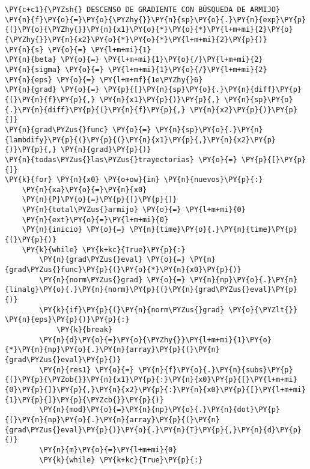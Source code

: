 \begin{itemize}
   \begin{tcolorbox}[breakable, size=fbox, boxrule=1pt, pad at break*=1mm,colback=cellbackground, colframe=cellborder]
\begin{Verbatim}[commandchars=\\\{\}]
\PY{c+c1}{\PYZsh{} DESCENSO DE GRADIENTE CON BÚSQUEDA DE ARMIJO}
\PY{n}{f}\PY{o}{=}\PY{o}{\PYZhy{}}\PY{n}{sp}\PY{o}{.}\PY{n}{exp}\PY{p}{(}\PY{o}{\PYZhy{}}\PY{n}{x1}\PY{o}{*}\PY{o}{*}\PY{l+m+mi}{2}\PY{o}{\PYZhy{}}\PY{n}{x2}\PY{o}{*}\PY{o}{*}\PY{l+m+mi}{2}\PY{p}{)}
\PY{n}{s} \PY{o}{=} \PY{l+m+mi}{1}
\PY{n}{beta} \PY{o}{=} \PY{l+m+mi}{1}\PY{o}{/}\PY{l+m+mi}{2}
\PY{n}{sigma} \PY{o}{=} \PY{l+m+mi}{1}\PY{o}{/}\PY{l+m+mi}{2}
\PY{n}{eps} \PY{o}{=} \PY{l+m+mf}{1e\PYZhy{}6}
\PY{n}{grad} \PY{o}{=} \PY{p}{[}\PY{n}{sp}\PY{o}{.}\PY{n}{diff}\PY{p}{(}\PY{n}{f}\PY{p}{,} \PY{n}{x1}\PY{p}{)}\PY{p}{,} \PY{n}{sp}\PY{o}{.}\PY{n}{diff}\PY{p}{(}\PY{n}{f}\PY{p}{,} \PY{n}{x2}\PY{p}{)}\PY{p}{]}
\PY{n}{grad\PYZus{}func} \PY{o}{=} \PY{n}{sp}\PY{o}{.}\PY{n}{lambdify}\PY{p}{(}\PY{p}{(}\PY{n}{x1}\PY{p}{,}\PY{n}{x2}\PY{p}{)}\PY{p}{,} \PY{n}{grad}\PY{p}{)}
\PY{n}{todas\PYZus{}las\PYZus{}trayectorias} \PY{o}{=} \PY{p}{[}\PY{p}{]}
\PY{k}{for} \PY{n}{x0} \PY{o+ow}{in} \PY{n}{nuevos}\PY{p}{:}
    \PY{n}{xa}\PY{o}{=}\PY{n}{x0}
    \PY{n}{P}\PY{o}{=}\PY{p}{[}\PY{p}{]}
    \PY{n}{total\PYZus{}armijo} \PY{o}{=} \PY{l+m+mi}{0}
    \PY{n}{ext}\PY{o}{=}\PY{l+m+mi}{0}
    \PY{n}{inicio} \PY{o}{=} \PY{n}{time}\PY{o}{.}\PY{n}{time}\PY{p}{(}\PY{p}{)}
    \PY{k}{while} \PY{k+kc}{True}\PY{p}{:}
        \PY{n}{grad\PYZus{}eval} \PY{o}{=} \PY{n}{grad\PYZus{}func}\PY{p}{(}\PY{o}{*}\PY{n}{x0}\PY{p}{)}   
        \PY{n}{norm\PYZus{}grad} \PY{o}{=} \PY{n}{np}\PY{o}{.}\PY{n}{linalg}\PY{o}{.}\PY{n}{norm}\PY{p}{(}\PY{n}{grad\PYZus{}eval}\PY{p}{)}
        \PY{k}{if}\PY{p}{(}\PY{n}{norm\PYZus{}grad} \PY{o}{\PYZlt{}} \PY{n}{eps}\PY{p}{)}\PY{p}{:}
            \PY{k}{break}
        \PY{n}{d}\PY{o}{=}\PY{o}{\PYZhy{}}\PY{l+m+mi}{1}\PY{o}{*}\PY{n}{np}\PY{o}{.}\PY{n}{array}\PY{p}{(}\PY{n}{grad\PYZus{}eval}\PY{p}{)}
        \PY{n}{res1} \PY{o}{=} \PY{n}{f}\PY{o}{.}\PY{n}{subs}\PY{p}{(}\PY{p}{\PYZob{}}\PY{n}{x1}\PY{p}{:}\PY{n}{x0}\PY{p}{[}\PY{l+m+mi}{0}\PY{p}{]}\PY{p}{,}\PY{n}{x2}\PY{p}{:}\PY{n}{x0}\PY{p}{[}\PY{l+m+mi}{1}\PY{p}{]}\PY{p}{\PYZcb{}}\PY{p}{)}
        \PY{n}{mod}\PY{o}{=}\PY{n}{np}\PY{o}{.}\PY{n}{dot}\PY{p}{(}\PY{n}{np}\PY{o}{.}\PY{n}{array}\PY{p}{(}\PY{n}{grad\PYZus{}eval}\PY{p}{)}\PY{o}{.}\PY{n}{T}\PY{p}{,}\PY{n}{d}\PY{p}{)}
        \PY{n}{m}\PY{o}{=}\PY{l+m+mi}{0}
        \PY{k}{while} \PY{k+kc}{True}\PY{p}{:}

\end{Verbatim}
\end{tcolorbox}
\end{itemize}
